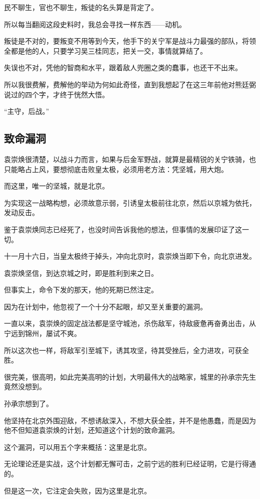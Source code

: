 \begin{multicols}{\theparacolNo}
		民不聊生，官也不聊生，叛徒的名头算是背定了。

		所以每当翻阅这段史料时，我总会寻找一样东西——动机。

		叛徒是不对的，要叛变不用等到今天，他手下的关宁军是战斗力最强的部队，将领全都是他的人，只要学习吴三桂同志，把关一交，事情就算结了。

		失误也不对，凭他的智商和水平，跟着敌人兜圈之类的蠢事，也还干不出来。

		所以我很费解，费解他的举动为何如此奇怪，直到我想起了在这三年前他对熊廷弼说过的四个字，才终于恍然大悟。

		“主守，后战。”

		\subsection{致命漏洞}
		袁崇焕很清楚，以战斗力而言，如果与后金军野战，就算是最精锐的关宁铁骑，也只能略占上风，要想彻底击败皇太极，必须用老方法：凭坚城，用大炮。

		而这里，唯一的坚城，就是北京。

		为实现这一战略构想，必须故意示弱，引诱皇太极前往北京，然后以京城为依托，发动反击。

		鉴于袁崇焕同志已经死了，也没时间告诉我他的想法，但事情的发展印证了这一切。

		十一月十六日，当皇太极终于掉头，冲向北京时，袁崇焕当即下令，向北京进发。

		袁崇焕坚信，到达京城之时，即是胜利到来之日。

		但事实上，命令下发的那天，他的死期已然注定。

		因为在计划中，他忽视了一个十分不起眼，却又至关重要的漏洞。

		一直以来，袁崇焕的固定战法都是坚守城池，杀伤敌军，待敌疲惫再奋勇出击，从宁远到锦州，屡试不爽。

		所以这次也一样，将敌军引至城下，诱其攻坚，待其受挫后，全力进攻，可获全胜。

		很完美，很高明，如此完美高明的计划，大明最伟大的战略家，城里的孙承宗先生竟然没想到。

		孙承宗想到了。

		他坚持在北京外围迎敌，不想诱敌深入，不想大获全胜，并不是他愚蠢，而是因为他不但知道袁崇焕的计划，还知道这个计划的致命漏洞。

		这个漏洞，可以用五个字来概括：这里是北京。

		无论理论还是实战，这个计划都无懈可击，之前宁远的胜利已经证明，它是行得通的。

		但是这一次，它注定会失败，因为这里是北京。


\end{multicols}
